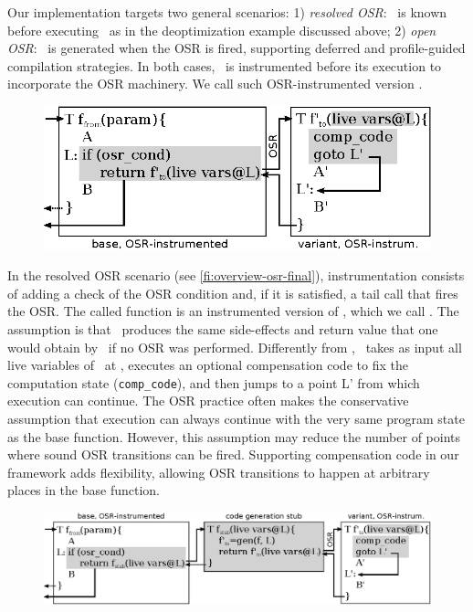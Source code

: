 Our implementation targets two general scenarios: 1) {\em resolved OSR}: \fvariant\ is known before executing \fbase\ as in the deoptimization example discussed above; 2) {\em open OSR}: \fvariant\ is generated when the OSR is fired, supporting deferred and profile-guided compilation strategies. In both cases, \fbase\ is instrumented before its execution to incorporate the OSR machinery. We call such OSR-instrumented version \fosrfrom.

\ifdefined\noauthorea
\begin{figure}[t]
\begin{center}
\includegraphics[width=0.7\columnwidth]{figures/overview-osr-final/overview-osr-final.eps}
\caption{\protect}
\end{center}
\end{figure}
\fi

In the resolved OSR scenario (see \myfigure\ref{fi:overview-osr-final}), instrumentation consists of adding a check of the OSR condition and, if it is satisfied, a tail call that fires the OSR. The called function is an instrumented version of \fvariant, which we call \fosrto. The assumption is that \fosrto\ produces the same side-effects and return value that one would obtain by \fbase\ if no OSR was performed. Differently from \fvariant, \fosrto\ takes as input all live variables of \fbase\ at \osrpoint, executes an optional compensation code to fix the computation state ({\tt comp\_code}), and then jumps to a point \textsf{L'} from which execution can continue. The OSR practice often makes the conservative assumption that execution can always continue with the very same program state as the base function. However, this assumption may reduce the number of points where sound OSR transitions can be fired. Supporting compensation code in our framework adds flexibility, allowing OSR transitions to happen at arbitrary places in the base function.

\ifdefined\noauthorea
\begin{figure}[h!]
\begin{center}
\includegraphics[width=1.0\columnwidth]{figures/overview-osr-open/overview-osr-open.eps}
\caption{\protect}
\end{center}
\end{figure}
\fi


